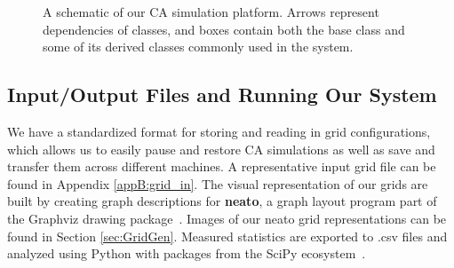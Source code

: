 \documentclass[a4paper,11pt]{report}
\begin{document}
\begin{figure}[htp]
\centering

\caption[CA Simulation Platform Architecture]{
	A schematic of our CA simulation platform. Arrows represent dependencies of classes, and boxes contain both the base class and some of its derived classes commonly used in the system.
}
\label{fig:sys_arch}
\end{figure}

\subsection{Input/Output Files and Running Our System}

We have a standardized format for storing and reading in grid configurations, which allows us to easily pause and restore CA simulations as well as save and transfer them across different machines. A representative input grid file can be found in Appendix \ref{appB:grid_in}. The visual representation of our grids are built by creating graph descriptions for \textbf{neato}, a graph layout program part of the Graphviz drawing package~\cite{el01}. Images of our neato grid representations can be found in Section \ref{sec:GridGen}. Measured statistics are exported to .csv files and analyzed using Python with packages from the SciPy ecosystem~\cite{jo14}.
\end{document}

